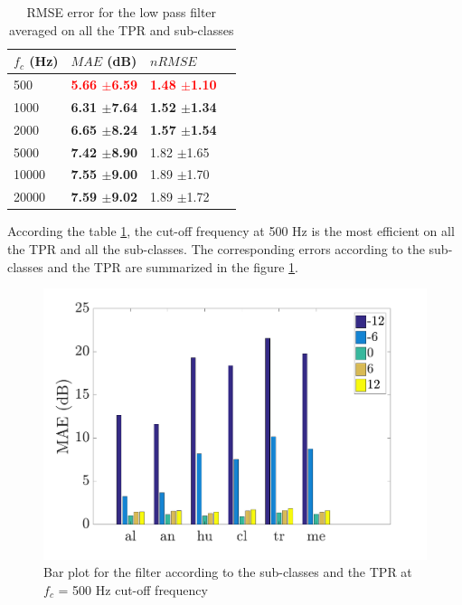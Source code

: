 \documentclass[twocolumn,a4paper,10pt]{article}
\begin{document}
\begin{table}[h]
\centering
\begin{tabular}{llll}
$f_c$ (Hz) & $MAE$ (dB) & $nRMSE$  \\ \hline
 500 & \textbf{\textcolor{red}{5.66 $\pm$6.59}} & \textbf{\textcolor{red}{1.48 $\pm$1.10}} \\ 
 1000 & \textbf{6.31 $\pm$7.64} & \textbf{1.52 $\pm$1.34} \\ 
 2000 & \textbf{6.65 $\pm$8.24} & \textbf{1.57 $\pm$1.54} \\ 
 5000 & \textbf{7.42 $\pm$8.90} & 1.82 $\pm$1.65 \\ 
10000 & \textbf{7.55 $\pm$9.00} & 1.89 $\pm$1.70 \\ 
20000 & \textbf{7.59 $\pm$9.02} & 1.89 $\pm$1.72 \\ 
\end{tabular} 
\caption{RMSE error for the low pass filter averaged on all the TPR and sub-classes}
\label{tab:results_filter}
\end{table}

According the table \ref{tab:results_filter}, the cut-off frequency at 500 Hz is the most efficient on all the TPR and all the sub-classes. The corresponding errors according to the sub-classes and the TPR are summarized in the figure \ref{fig:filterAmbiance}.\\

\begin{figure}[hbtp]
\centering
\includegraphics[width=\linewidth]{../image/AmbianceFilter.pdf}
\caption{Bar plot for the filter according to the sub-classes and the TPR at $f_c$ = 500 Hz cut-off frequency}
\label{fig:filterAmbiance}
\end{figure}
\end{document}
